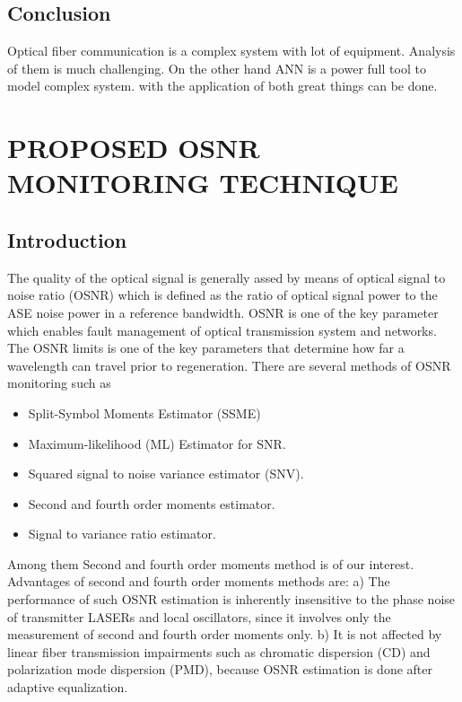 \documentclass[12pt]{report}
\begin{document}
\section{Conclusion}
Optical fiber communication is a complex system with lot of equipment. Analysis of them is much challenging. On the other hand ANN is a power full tool to model complex system. with the application of both great things can be done.
\fi
\chapter{PROPOSED OSNR MONITORING TECHNIQUE}
\section{Introduction}
The quality of the optical signal is generally assed by means of optical signal to noise ratio (OSNR) which is defined as the ratio of optical signal power to the ASE noise power in a reference bandwidth. OSNR is one of the key parameter which enables fault management of optical transmission system and networks. The OSNR limits is one of the key parameters that determine how far a wavelength can travel prior to regeneration. There are several methods of OSNR monitoring such as
\begin{itemize}
	\item Split-Symbol Moments Estimator (SSME)
	\item Maximum-likelihood (ML) Estimator for SNR.
	\item Squared signal to noise variance estimator (SNV).
	\item Second and fourth order moments estimator.
	\item Signal to variance ratio estimator.
\end{itemize}
Among them Second and fourth order moments method is of our interest. Advantages of second and fourth order moments methods are:
a) The performance of such OSNR estimation is inherently insensitive to the phase noise of transmitter LASERs and local oscillators, since it involves only the measurement of second and fourth order moments only.
b) It is not affected by linear fiber transmission impairments such as chromatic dispersion (CD) and polarization mode dispersion (PMD), because OSNR estimation is done after adaptive equalization.
\end{document}
